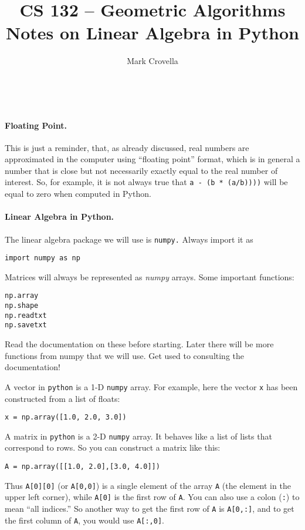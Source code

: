 \documentclass{article}
\begin{document}
\solutiontrue

\title{CS 132 -- Geometric Algorithms\\[0.25\baselineskip]Notes on Linear Algebra in Python}
\author{Mark Crovella}
\date{~}
\maketitle

\paragraph{Floating Point.}  This is just a reminder, that, as already discussed, real numbers are approximated in the computer using ``floating point'' format, which is in general a number that is close but not necessarily exactly equal to the real number of interest.   So, for example, it is not always true that \texttt{a - (b * (a/b))))} will be equal to zero when computed in Python.    

\paragraph{Linear Algebra in Python.} The linear algebra package we will use is \texttt{numpy.}  Always import it as
\begin{verbatim}
import numpy as np
\end{verbatim}
Matrices will always be represented as \emph{numpy} arrays.   Some important functions:
\begin{verbatim}
np.array
np.shape
np.readtxt
np.savetxt
\end{verbatim}
Read the documentation on these before starting.  Later there will be more functions from numpy that we will use.  Get used to consulting the documentation!

A vector in \texttt{python} is a 1-D \texttt{numpy} array.
For example, here the vector \texttt{x} has been constructed from a list of floats:
\begin{verbatim}
x = np.array([1.0, 2.0, 3.0])
\end{verbatim}

A matrix in \texttt{python} is a 2-D \texttt{numpy} array.  It behaves like a list of lists
that correspond to rows.    So you can construct a matrix like this:
\begin{verbatim}
A = np.array([[1.0, 2.0],[3.0, 4.0]])
\end{verbatim}

Thus \texttt{A[0][0]} (or \texttt{A[0,0]}) is
a single element of the array \texttt{A} (the element in the upper left
corner), while \texttt{A[0]} is the first row of \texttt{A}.  You can
also use a colon (\texttt{:}) to mean ``all indices.''  So another way
to get the first row of \texttt{A} is \texttt{A[0,:]}, and to get the
first column of \texttt{A}, you would use \texttt{A[:,0]}.
\end{document}
